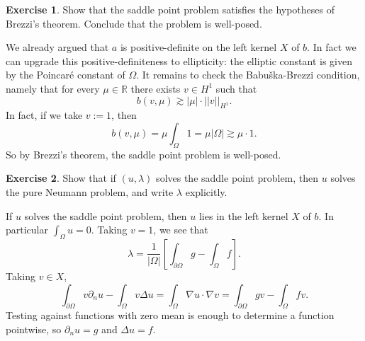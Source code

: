 \documentclass[10pt]{article}
\newcommand{\RR}{\mathbb{R}}
\theoremstyle{definition}
\newtheorem{exer}{Exercise}
\begin{document}
\begin{exer}
Show that the saddle point problem satisfies the hypotheses of Brezzi's theorem.
Conclude that the problem is well-posed.
\end{exer}

We already argued that $a$ is positive-definite on the left kernel $X$ of $b$.
In fact we can upgrade this positive-definiteness to ellipticity: the elliptic constant is given by the Poincar\'e constant of $\Omega$.
It remains to check the Babuška-Brezzi condition, namely that for every $\mu \in \RR$ there exists $v \in H^1$ such that
$$b(v, \mu) \gtrsim |\mu| \cdot ||v||_{H^1}.$$
In fact, if we take $v := 1$, then
$$b(v, \mu) = \mu \int_\Omega 1 = \mu |\Omega| \gtrsim \mu \cdot 1.$$
So by Brezzi's theorem, the saddle point problem is well-posed.

\begin{exer}
Show that if $(u, \lambda)$ solves the saddle point problem, then $u$ solves the pure Neumann problem, and write $\lambda$ explicitly.
\end{exer}

If $u$ solves the saddle point problem, then $u$ lies in the left kernel $X$ of $b$.
In particular $\int_\Omega u = 0$.
Taking $v = 1$, we see that
$$\lambda = \frac{1}{|\Omega|} \left[\int_{\partial \Omega} g - \int_\Omega f\right].$$
Taking $v \in X$,
$$\int_{\partial \Omega} v\partial_n u - \int_\Omega v\Delta u = \int_\Omega \nabla u \cdot \nabla v = \int_{\partial \Omega} gv - \int_\Omega fv.$$
Testing against functions with zero mean is enough to determine a function pointwise, so $\partial_n u = g$ and $\Delta u = f$.
\end{document}
